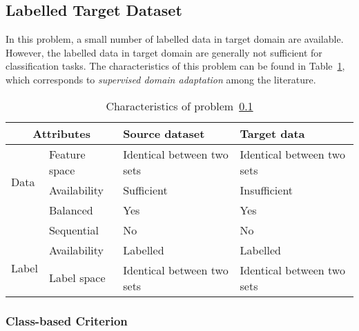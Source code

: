 \documentclass[prodmode]{acmsmall}  %
\begin{document}
\subsection{Labelled Target Dataset}
\label{sec:HOMOsup}
In this problem, a small number of labelled data in target domain are available. However, the labelled data in target domain are generally not sufficient for classification tasks. The characteristics of this problem can be found in Table~\ref{tab:HOMOsup}, which corresponds to \textit{supervised domain adaptation} among the literature.
\begin{table}[htbp!]
\caption{Characteristics of problem~\ref{sec:HOMOsup}}
\label{tab:HOMOsup}
\begin{center}
\begin{small}
\begin{tabular}{|p{1cm}<{\centering}|m{2.5cm}<{\centering}|m{4.3cm}<{\centering}|m{4.3cm}<{\centering}|}
\hline
\multicolumn{2}{|c|}{Attributes} & Source dataset & Target data \\
\hline \hline
\multirow{3}{*}{Data} & Feature space & Identical between two sets & Identical between two sets \\ 
\cline{2-4}{} & Availability & Sufficient & {\color{red}Insufficient}\\
\cline{2-4}{} & Balanced & Yes & Yes\\
\cline{2-4}{} & Sequential & No & No \\
\hline \hline
\multirow{2}{*}{Label} & Availability & Labelled & Labelled \\
\cline{2-4}{}  & Label space & Identical between two sets & Identical between two sets \\ 
\hline
\end{tabular}
\end{small}
\end{center}
\end{table}

\subsubsection{Class-based Criterion}
\label{sec:HOMOSupClass}
\end{document}
